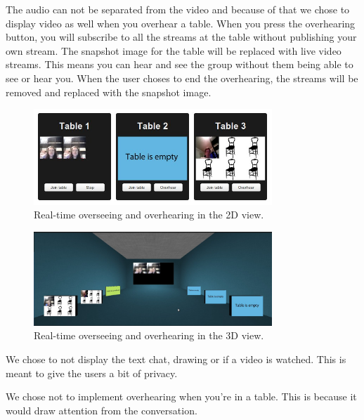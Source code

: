 \documentclass[12pt, titlepage]{article}
\begin{document}
The audio can not be separated from the video and because of that we chose to display video as well when you overhear a table. When you press the overhearing button, you will subscribe to all the streams at the table without publishing your own stream. The snapshot image for the table will be replaced with live video streams. This means you can hear and see the group without them being able to see or hear you. When the user choses to end the overhearing, the streams will be removed and replaced with the snapshot image.
\begin{figure}[H]
  \centering
	\includegraphics[width=0.8\textwidth,keepaspectratio]{overhear2d.jpg}
  \caption{Real-time overseeing and overhearing in the 2D view.}
\end{figure}
\begin{figure}[H]
  \centering
	\includegraphics[width=0.8\textwidth,keepaspectratio]{3doverhearing.jpg}
  \caption{Real-time overseeing and overhearing in the 3D view.}
\end{figure}
We chose to not display the text chat, drawing or if a video is watched. This is meant to give the users a bit of privacy. 

We chose not to implement overhearing when you’re in a table. This is because it would draw attention from the conversation.
\end{document}
